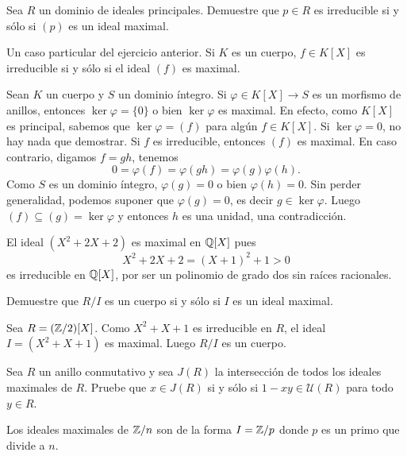 \begin{exercise}
Sea $R$ un dominio de ideales principales. Demuestre que $p\in R$ es irreducible si y sólo si $(p)$ es un ideal maximal. 	
\end{exercise}

Un caso particular del ejercicio anterior. Si $K$ es un cuerpo, $f\in K[X]$ es irreducible si y sólo si el
ideal $(f)$ es maximal.  

\begin{example}
Sean $K$ un cuerpo y $S$ un dominio íntegro. Si $\varphi\in K[X]\to S$ es un morfismo de anillos, entonces $\ker \varphi=\{0\}$ o bien $\ker\varphi$ es maximal. En efecto,
como $K[X]$ es principal, sabemos que $\ker\varphi=(f)$ para algún $f\in K[X]$. Si $\ker\varphi=0$, no hay nada que demostrar. 
Si $f$ es irreducible, entonces $(f)$ es maximal. En caso contrario, 
digamos $f=gh$, tenemos 
\[
0=\varphi(f)=\varphi(gh)=\varphi(g)\varphi(h).
\]
Como $S$ es un dominio íntegro, $\varphi(g)=0$ o bien $\varphi(h)=0$. Sin perder generalidad, podemos suponer que $\varphi(g)=0$,
es decir $g\in\ker \varphi$. Luego $(f)\subseteq (g)=\ker\varphi$ y entonces $h$ es una unidad, una contradicción. 
\end{example}

\begin{example}
El ideal $(X^2+2X+2)$ es maximal en $\mathbb{Q}[X]$ pues 
\[
X^2+2X+2=(X+1)^2+1>0
\]
es irreducible en $\mathbb{Q}[X]$, por ser un polinomio de grado dos sin raíces racionales.  	
\end{example}

\begin{exercise}
Demuestre que $R/I$ es un cuerpo si y sólo si $I$ es un ideal maximal.	
\end{exercise}
	
\begin{example}
Sea $R=(\mathbb{Z}/2)[X]$. Como $X^2+X+1$ es irreducible en $R$, el ideal $I=(X^2+X+1)$ es maximal. Luego $R/I$ es un cuerpo.
\end{example}

\begin{exercise}
\label{xca:Jacobson}
Sea $R$ un anillo conmutativo y sea $J(R)$ la intersección de todos
los ideales maximales de $R$. Pruebe que $x\in J(R)$ si y sólo si
$1-xy\in\mathcal{U}(R)$ para todo $y\in R$. 
\end{exercise}

\begin{exercise}
\label{xca:maxZn}
Los ideales maximales de $\mathbb{Z}/n$ son de la forma $I=\mathbb{Z}/p$ donde $p$ es un primo que divide a $n$.
\end{exercise}


